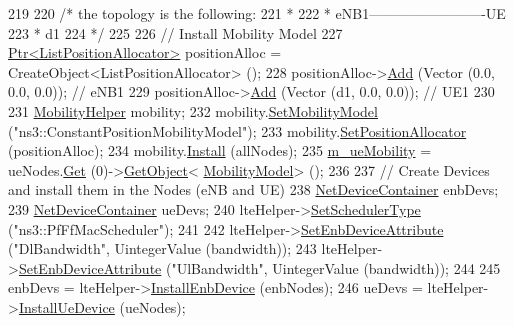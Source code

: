\begin{DoxyCode}
219 
220 \textcolor{comment}{/*   the topology is the following:}
221 \textcolor{comment}{ *}
222 \textcolor{comment}{ *   eNB1-------------------------UE}
223 \textcolor{comment}{ *                  d1}
224 \textcolor{comment}{ */}
225 
226   \textcolor{comment}{// Install Mobility Model}
227   \hyperlink{classns3_1_1Ptr}{Ptr<ListPositionAllocator>} positionAlloc = CreateObject<ListPositionAllocator> 
      ();
228   positionAlloc->\hyperlink{classns3_1_1ListPositionAllocator_a460e82f015ac012a73ba0ea0cccb3486}{Add} (Vector (0.0, 0.0, 0.0));                  \textcolor{comment}{// eNB1}
229   positionAlloc->\hyperlink{classns3_1_1ListPositionAllocator_a460e82f015ac012a73ba0ea0cccb3486}{Add} (Vector (d1, 0.0, 0.0));           \textcolor{comment}{// UE1}
230 
231   \hyperlink{classns3_1_1MobilityHelper}{MobilityHelper} mobility;
232   mobility.\hyperlink{classns3_1_1MobilityHelper_a030275011b6f40682e70534d30280aba}{SetMobilityModel} (\textcolor{stringliteral}{"ns3::ConstantPositionMobilityModel"});
233   mobility.\hyperlink{classns3_1_1MobilityHelper_ac59d5295076be3cc11021566713a28c5}{SetPositionAllocator} (positionAlloc);
234   mobility.\hyperlink{classns3_1_1MobilityHelper_a07737960ee95c0777109cf2994dd97ae}{Install} (allNodes);
235   \hyperlink{classLteUplinkPowerControlTestCase_a0b8bf35679af00783442c2e310b30e45}{m\_ueMobility} = ueNodes.\hyperlink{classns3_1_1NodeContainer_a9ed96e2ecc22e0f5a3d4842eb9bf90bf}{Get} (0)->\hyperlink{classns3_1_1Object_a13e18c00017096c8381eb651d5bd0783}{GetObject}<
      \hyperlink{classns3_1_1MobilityModel}{MobilityModel}> ();
236 
237   \textcolor{comment}{// Create Devices and install them in the Nodes (eNB and UE)}
238   \hyperlink{classns3_1_1NetDeviceContainer}{NetDeviceContainer} enbDevs;
239   \hyperlink{classns3_1_1NetDeviceContainer}{NetDeviceContainer} ueDevs;
240   lteHelper->\hyperlink{classns3_1_1LteHelper_a8f86e55b8b80a81732c4b2df00fb25d5}{SetSchedulerType} (\textcolor{stringliteral}{"ns3::PfFfMacScheduler"});
241 
242   lteHelper->\hyperlink{classns3_1_1LteHelper_ac42f0f3d6cd8473d810bfbbeb5d592e0}{SetEnbDeviceAttribute} (\textcolor{stringliteral}{"DlBandwidth"}, UintegerValue (bandwidth));
243   lteHelper->\hyperlink{classns3_1_1LteHelper_ac42f0f3d6cd8473d810bfbbeb5d592e0}{SetEnbDeviceAttribute} (\textcolor{stringliteral}{"UlBandwidth"}, UintegerValue (bandwidth));
244 
245   enbDevs = lteHelper->\hyperlink{classns3_1_1LteHelper_a5e009ad35ef85f46b5a6099263f15a03}{InstallEnbDevice} (enbNodes);
246   ueDevs = lteHelper->\hyperlink{classns3_1_1LteHelper_ac9cd932d7de92811cfa953c2e3b2fc9f}{InstallUeDevice} (ueNodes);

\end{DoxyCode}
